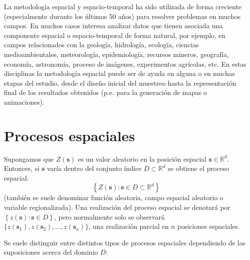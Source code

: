 \documentclass[
]{book}
\theoremstyle{break}
\theoremstyle{definition}
\theoremstyle{definition}
\theoremstyle{definition}
\theoremstyle{definition}
\theoremstyle{remark}
\begin{document}
La metodología espacial y espacio-temporal ha sido utilizada de forma creciente (especialmente durante los últimos 50 años) para resolver problemas en muchos campos.
En muchos casos interesa analizar datos que tienen asociada una componente espacial o espacio-temporal de forma natural, por ejemplo, en campos relacionados con la geología, hidrología, ecología, ciencias medioambientales, meteorología, epidemiología, recursos mineros, geografía, economía, astronomía, proceso de imágenes, experimentos agrícolas, etc.
En estas disciplinas la metodología espacial puede ser de ayuda en alguna o en muchas etapas del estudio, desde el diseño inicial del muestreo hasta la representación final de los resultados obtenidos (p.e. para la generación de mapas o animaciones).

\section{Procesos espaciales}\label{proc-esp}

Supongamos que \(Z(\mathbf{s})\) es un valor aleatorio en la posición espacial \(\mathbf{s} \in \mathbb{R}^{d}\).
Entonces, si \(\mathbf{s}\) varía dentro del conjunto índice \(D\subset \mathbb{R}^{d}\) se obtiene el proceso espacial:
\[\left\{ Z(\mathbf{s}) : \mathbf{s} \in D \subset \mathbb{R}^{d} \right\}\]
(también se suele denominar función aleatoria, campo espacial aleatorio o variable regionalizada).
Una realización del proceso espacial se denotará por \(\left\{ z(\mathbf{s}) : \mathbf{s} \in D \right\}\), pero normalmente solo se observará \(\{z(\mathbf{s}_1), z(\mathbf{s}_2), \ldots, z(\mathbf{s}_n)\}\), una realización parcial en \(n\) posiciones espaciales.

Se suele distinguir entre distintos tipos de procesos espaciales dependiendo de las suposiciones acerca del dominio \(D\):
\end{document}
